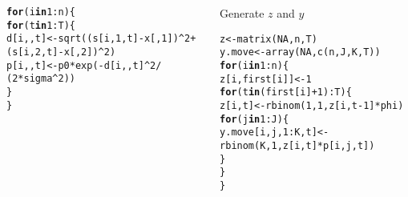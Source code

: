 \documentclass[color=usenames,dvipsnames]{beamer}\usepackage[]{graphicx}\usepackage[]{color}
\makeatletter
\newcommand{\hlnum}[1]{\textcolor[rgb]{0.69,0.494,0}{#1}}%
\newcommand{\hlopt}[1]{\textcolor[rgb]{0,0,0}{#1}}%
\newcommand{\hlstd}[1]{\textcolor[rgb]{0,0,0}{#1}}%
\newcommand{\hlkwa}[1]{\textcolor[rgb]{0,0,0}{\textbf{#1}}}%
\newcommand{\hlkwb}[1]{\textcolor[rgb]{0,0.341,0.682}{#1}}%
\newcommand{\hlkwd}[1]{\textcolor[rgb]{0.004,0.004,0.506}{#1}}%
\newenvironment{kframe}{%
 \def\at@end@of@kframe{}%
 \ifinner\ifhmode%
  \def\at@end@of@kframe{\end{minipage}}%
  \begin{minipage}{\columnwidth}%
 \fi\fi%
 \def\FrameCommand##1{\hskip\@totalleftmargin \hskip-\fboxsep
 \colorbox{shadecolor}{##1}\hskip-\fboxsep
     \hskip-\linewidth \hskip-\@totalleftmargin \hskip\columnwidth}%
 \MakeFramed {\advance\hsize-\width
   \@totalleftmargin\z@ \linewidth\hsize
   \@setminipage}}%
 {\par\unskip\endMakeFramed%
 \at@end@of@kframe}
\newenvironment{knitrout}{}{} %
\makeatother
\begin{document}
\begin{frame}[fragile]
\begin{columns}
\begin{column}{0.5\textwidth}
\begin{knitrout}
\begin{kframe}
\begin{alltt}
\hlkwa{for}\hlstd{(i} \hlkwa{in} \hlnum{1}\hlopt{:}\hlstd{n) \{}
    \hlkwa{for}\hlstd{(t} \hlkwa{in} \hlnum{1}\hlopt{:}\hlstd{T) \{}
        \hlstd{d[i,,t]} \hlkwb{<-} \hlkwd{sqrt}\hlstd{((s[i,}\hlnum{1}\hlstd{,t]}\hlopt{-}\hlstd{x[,}\hlnum{1}\hlstd{])}\hlopt{^}\hlnum{2} \hlopt{+}
                        \hlstd{(s[i,}\hlnum{2}\hlstd{,t]}\hlopt{-}\hlstd{x[,}\hlnum{2}\hlstd{])}\hlopt{^}\hlnum{2}\hlstd{)}
        \hlstd{p[i,,t]} \hlkwb{<-} \hlstd{p0}\hlopt{*}\hlkwd{exp}\hlstd{(}\hlopt{-}\hlstd{d[i,,t]}\hlopt{^}\hlnum{2} \hlopt{/}
                          \hlstd{(}\hlnum{2}\hlopt{*}\hlstd{sigma}\hlopt{^}\hlnum{2}\hlstd{))}
    \hlstd{\}}
\hlstd{\}}
\end{alltt}
\end{kframe}
\end{knitrout}
    \end{column}
    \pause
    \begin{column}{0.5\textwidth}%
Generate $z$ and $y$
\begin{knitrout}\tiny
{}\color{fgcolor}\begin{kframe}
\begin{alltt}
\hlstd{z} \hlkwb{<-} \hlkwd{matrix}\hlstd{(}\hlnum{NA}\hlstd{, n, T)}
\hlstd{y.move} \hlkwb{<-} \hlkwd{array}\hlstd{(}\hlnum{NA}\hlstd{,} \hlkwd{c}\hlstd{(n, J, K, T))}
\hlkwa{for}\hlstd{(i} \hlkwa{in} \hlnum{1}\hlopt{:}\hlstd{n) \{}
    \hlstd{z[i,first[i]]} \hlkwb{<-} \hlnum{1}
    \hlkwa{for}\hlstd{(t} \hlkwa{in} \hlstd{(first[i]}\hlopt{+}\hlnum{1}\hlstd{)}\hlopt{:}\hlstd{T) \{}
        \hlstd{z[i,t]} \hlkwb{<-} \hlkwd{rbinom}\hlstd{(}\hlnum{1}\hlstd{,} \hlnum{1}\hlstd{, z[i,t}\hlopt{-}\hlnum{1}\hlstd{]}\hlopt{*}\hlstd{phi)}
        \hlkwa{for}\hlstd{(j} \hlkwa{in} \hlnum{1}\hlopt{:}\hlstd{J) \{}
            \hlstd{y.move[i,j,}\hlnum{1}\hlopt{:}\hlstd{K,t]} \hlkwb{<-}
                \hlkwd{rbinom}\hlstd{(K,} \hlnum{1}\hlstd{, z[i,t]}\hlopt{*}\hlstd{p[i,j,t])}
        \hlstd{\}}
    \hlstd{\}}
\hlstd{\}}
\end{alltt}
\end{kframe}
\end{knitrout}
\end{column}
  \end{columns}
\end{frame}
\end{document}
